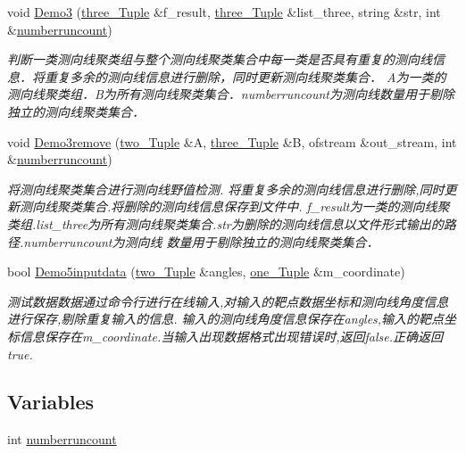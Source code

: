 \begin{DoxyCompactItemize}
void \hyperlink{multiloc_8txt_a368ea750ee191237f17be101cf888c8f}{Demo3} (\hyperlink{multiloc_8txt_aa614d5a3aa93583e717bf9a9c9b6627b}{three\+\_\+\+Tuple} \&f\+\_\+result, \hyperlink{multiloc_8txt_aa614d5a3aa93583e717bf9a9c9b6627b}{three\+\_\+\+Tuple} \&list\+\_\+three, string \&str, int \&\hyperlink{multiloc_8txt_a40bd71ae5bbd0f6944663390e9df5286}{numberruncount})
\begin{DoxyCompactList}\small\item\em 判断一类测向线聚类组与整个测向线聚类集合中每一类是否具有重复的测向线信息．将重复多余的测向线信息进行删除，同时更新测向线聚类集合． A为一类的测向线聚类组．\+B为所有测向线聚类集合．numberruncount为测向线数量用于剔除独立的测向线聚类集合． \end{DoxyCompactList}\item 
void \hyperlink{multiloc_8txt_aacbf4693435866645c6f3b0bd77b65ee}{Demo3remove} (\hyperlink{multiloc_8txt_a2e41d128befae015727cbf20484696a9}{two\+\_\+\+Tuple} \&A, \hyperlink{multiloc_8txt_aa614d5a3aa93583e717bf9a9c9b6627b}{three\+\_\+\+Tuple} \&B, ofstream \&out\+\_\+stream, int \&\hyperlink{multiloc_8txt_a40bd71ae5bbd0f6944663390e9df5286}{numberruncount})
\begin{DoxyCompactList}\small\item\em 将测向线聚类集合进行测向线野值检测. 将重复多余的测向线信息进行删除,同时更新测向线聚类集合.\+将删除的测向线信息保存到文件中. f\+\_\+result为一类的测向线聚类组.\+list\+\_\+three为所有测向线聚类集合.\+str为删除的测向线信息以文件形式输出的路径.\+numberruncount为测向线 数量用于剔除独立的测向线聚类集合． \end{DoxyCompactList}\item 
bool \hyperlink{multiloc_8txt_a956609fd7d2a2b24fc2acce8d841142d}{Demo5inputdata} (\hyperlink{multiloc_8txt_a2e41d128befae015727cbf20484696a9}{two\+\_\+\+Tuple} \&angles, \hyperlink{multiloc_8txt_a490e31016ad1c0d99b23e323d64e3aac}{one\+\_\+\+Tuple} \&m\+\_\+coordinate)
\begin{DoxyCompactList}\small\item\em 测试数据数据通过命令行进行在线输入,对输入的靶点数据坐标和测向线角度信息进行保存,剔除重复输入的信息. 输入的测向线角度信息保存在angles,输入的靶点坐标信息保存在m\+\_\+coordinate.\+当输入出现数据格式出现错误时,返回false.\+正确返回true. \end{DoxyCompactList}\end{DoxyCompactItemize}
\subsection*{Variables}
\begin{DoxyCompactItemize}
\item 
int \hyperlink{multiloc_8txt_a40bd71ae5bbd0f6944663390e9df5286}{numberruncount}
\end{DoxyCompactItemize}


